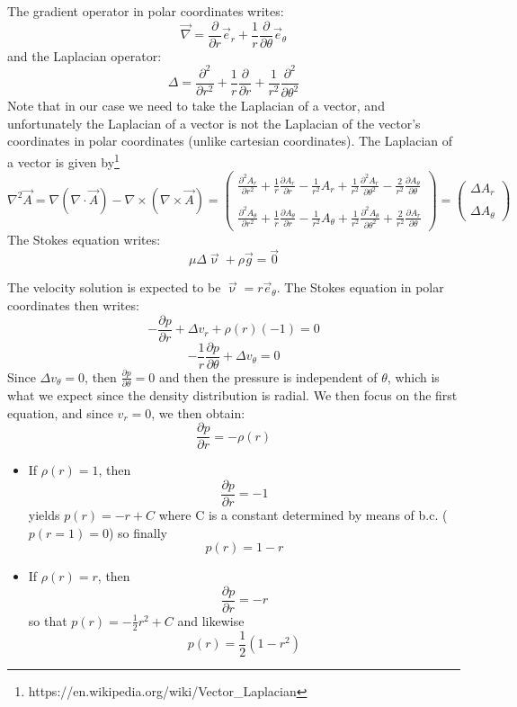The gradient operator in polar coordinates writes:
\[
{\vec \nabla} = \frac{\partial }{\partial r} {\vec e}_r 
+ \frac{1}{r} \frac{\partial }{\partial \theta} {\vec e}_\theta 
\]
and the Laplacian operator:
\[
\Delta = \frac{\partial^2}{\partial r^2} + \frac{1}{r} \frac{\partial }{\partial r} + \frac{1}{r^2} \frac{\partial^2 }{\partial \theta^2}
\]
Note that in our case we need to take the Laplacian of a vector, and unfortunately the Laplacian of a vector is not the Laplacian 
of the vector's coordinates in polar coordinates (unlike cartesian coordinates). 
The Laplacian of a vector is given by\footnote{https://en.wikipedia.org/wiki/Vector\_Laplacian} 
\[
\nabla^2 \vec{A} = \nabla(\nabla\cdot\vec{A}) - \nabla\times(\nabla \times\vec{A})
=
\left(
\begin{array}{l}
\frac{\partial^2 A_r}{\partial r^2} + \frac{1}{r} \frac{\partial A_r}{\partial r} - \frac{1}{r^2} A_r  + \frac{1}{r^2} \frac{\partial^2 A_r}{\partial \theta^2}  - \frac{2}{r^2} \frac{\partial A_\theta}{\partial \theta} \\ \\
\frac{\partial^2 A_\theta}{\partial r^2} + \frac{1}{r} \frac{\partial A_\theta}{\partial r} - \frac{1}{r^2} A_\theta  + \frac{1}{r^2} \frac{\partial^2 A_\theta}{\partial \theta^2}  + \frac{2}{r^2} \frac{\partial A_r}{\partial \theta} 
\end{array}
\right)
=
\left(
\begin{array}{l}
\Delta A_r \\ \\ \Delta A_\theta
\end{array}
\right)
\]
The Stokes equation writes:
\[
\mu \Delta {\vec \upnu} + \rho {\vec g} = {\vec 0 }
\]


The velocity solution is expected to be ${\vec \upnu}= r {\vec e}_\theta $.
The Stokes equation in polar coordinates then writes:
\[
-\frac{\partial p}{\partial r} + \Delta v_r + \rho(r) (- 1)  = 0 
\]
\[
-\frac{1}{r}\frac{\partial p}{\partial \theta} + \Delta v_\theta = 0
\]
Since $\Delta v_\theta = 0$, then $\frac{\partial p}{\partial \theta}=0$ and then the pressure is independent of $\theta$, 
which is what we expect since the density distribution is radial. 
We then focus on the first equation, and since $v_r=0$, we then obtain:
\[
\frac{\partial p}{\partial r}  = - \rho(r)
\]

\begin{itemize}
\item If $\rho(r)=1$, then 
\[
\frac{\partial p}{\partial r}  = - 1
\]
yields $p(r)=-r+C$ where C is a constant determined by means of b.c. ($p(r=1)=0$) so finally
\[
\boxed{
p(r)=1-r
}
\]

\item If $\rho(r)=r$, then 
\[
\frac{\partial p}{\partial r}  = - r
\]
so that $p(r)=-\frac{1}{2}r^2 + C$ and likewise
\[
\boxed{
p(r)=\frac{1}{2} (1- r^2)
}
\]
\end{itemize}
  
